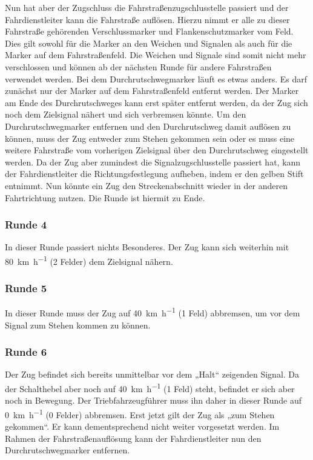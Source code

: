    Nun hat aber der Zugschluss die Fahrstraßenzugschlusstelle passiert und der Fahrdienstleiter kann die Fahrstraße auflösen. Hierzu nimmt er alle zu dieser Fahrstraße gehörenden Verschlussmarker und Flankenschutzmarker vom Feld. Dies gilt sowohl für die Marker an den Weichen und Signalen als auch für die Marker auf dem Fahrstraßenfeld. Die Weichen und Signale sind somit nicht mehr verschlossen und können ab der nächsten Runde für andere Fahrstraßen verwendet werden. Bei dem Durchrutschwegmarker läuft es etwas anders. Es darf zunächst nur der Marker auf dem Fahrstraßenfeld entfernt werden. Der Marker am Ende des Durchrutschweges kann erst später entfernt werden, da der Zug sich noch dem Zielsignal nähert und sich verbremsen könnte. Um den Durchrutschwegmarker entfernen und den Durchrutschweg damit auflösen zu können, muss der Zug entweder zum Stehen gekommen sein oder es muss eine weitere Fahrstraße vom vorherigen Zielsignal über den Durchrutschweg eingestellt werden. 
  Da der Zug aber zumindest die Signalzugschlusstelle passiert hat, kann der Fahrdienstleiter die Richtungsfestlegung aufheben, indem er den gelben Stift entnimmt. Nun könnte ein Zug den Streckenabschnitt wieder in der anderen Fahrtrichtung nutzen. Die Runde ist hiermit zu Ende.


\subsubsection*{Runde 4}
  In dieser Runde passiert nichts Besonderes. Der Zug kann sich weiterhin mit \SI{80}{\kilo\metre\per\hour} (2 Felder) dem Zielsignal nähern.


\subsubsection*{Runde 5}
  In dieser Runde muss der Zug auf \SI{40}{\kilo\metre\per\hour} (1 Feld) abbremsen, um vor dem Signal zum Stehen kommen zu können.


\subsubsection*{Runde 6}
  Der Zug befindet sich bereits unmittelbar vor dem „Halt“ zeigenden Signal. Da der Schalthebel aber noch auf \SI{40}{\kilo\metre\per\hour} (1 Feld) steht, befindet er sich aber noch in Bewegung. Der Triebfahrzeugführer muss ihn daher in dieser Runde auf \SI{0}{\kilo\metre\per\hour} (0 Felder) abbremsen. Erst jetzt gilt der Zug als „zum Stehen gekommen“. Er kann dementsprechend nicht weiter vorgesetzt werden. Im Rahmen der Fahrstraßenauflösung kann der Fahrdienstleiter nun den Durchrutschwegmarker entfernen.

